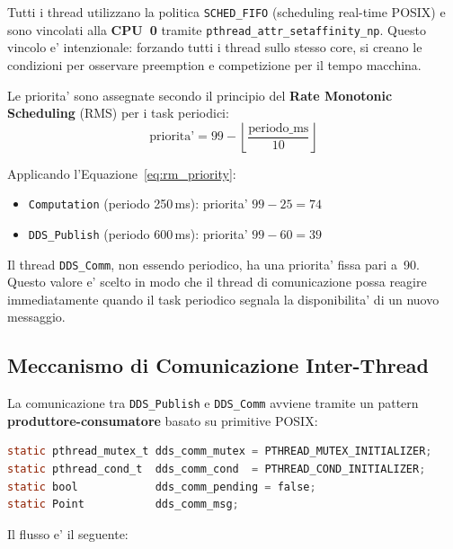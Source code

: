 Tutti i thread utilizzano la politica \texttt{SCHED\_FIFO} (scheduling
real-time POSIX) e sono vincolati alla \textbf{CPU~0} tramite
\texttt{pthread\_attr\_setaffinity\_np}. Questo vincolo e' intenzionale:
forzando tutti i thread sullo stesso core, si creano le condizioni per
osservare preemption e competizione per il tempo macchina.

Le priorita' sono assegnate secondo il principio del
\textbf{Rate Monotonic Scheduling} (RMS) per i task periodici:
\begin{equation}
    \text{priorita'} = 99 - \left\lfloor \frac{\text{periodo\_ms}}{10} \right\rfloor
    \label{eq:rm_priority}
\end{equation}

Applicando l'Equazione~\ref{eq:rm_priority}:
\begin{itemize}
    \item \texttt{Computation} (periodo 250\,ms): priorita' $99 - 25 = 74$
    \item \texttt{DDS\_Publish} (periodo 600\,ms): priorita' $99 - 60 = 39$
\end{itemize}

Il thread \texttt{DDS\_Comm}, non essendo periodico, ha una priorita'
fissa pari a~90. Questo valore e' scelto in modo che il thread di
comunicazione possa reagire immediatamente quando il task periodico
segnala la disponibilita' di un nuovo messaggio.

\subsection{Meccanismo di Comunicazione Inter-Thread}
\label{subsec:ipc}

La comunicazione tra \texttt{DDS\_Publish} e \texttt{DDS\_Comm} avviene
tramite un pattern \textbf{produttore-consumatore} basato su primitive
POSIX:

\begin{lstlisting}[language=C, caption={Variabili condivise per la comunicazione inter-thread.}, label={lst:shared_vars}]
static pthread_mutex_t dds_comm_mutex = PTHREAD_MUTEX_INITIALIZER;
static pthread_cond_t  dds_comm_cond  = PTHREAD_COND_INITIALIZER;
static bool            dds_comm_pending = false;
static Point           dds_comm_msg;
\end{lstlisting}

Il flusso e' il seguente:

